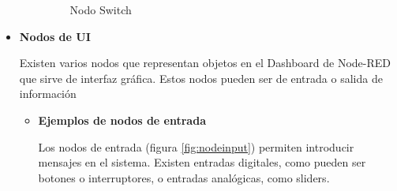 \begin{itemize}
\begin{itemize}
\begin{figure}[H]
\begin{minipage}[b]{0.5\textwidth}
  \end{minipage}
  \caption{Nodo Switch}\label{fig:nodeswitch}
\end{figure}

\end{itemize}


\item \textbf{Nodos de UI}

Existen varios nodos que representan objetos en el Dashboard de Node-RED que sirve de interfaz gráfica. Estos nodos pueden ser de entrada o salida de información

\begin{itemize}
\item \textbf{Ejemplos de nodos de entrada}

Los nodos de entrada (figura \ref{fig:nodeinput}) permiten introducir mensajes en el sistema. Existen entradas digitales, como pueden ser botones o interruptores, o entradas analógicas, como sliders.


\end{itemize}
\end{itemize}
